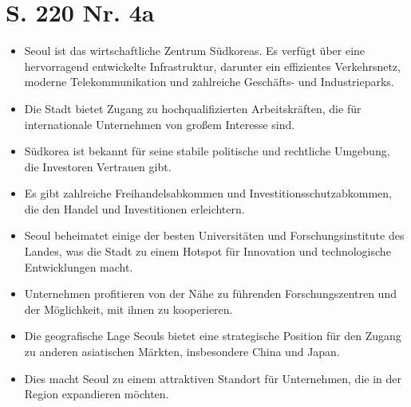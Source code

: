 \documentclass[12pt,a4paper]{report}
\begin{document}
	\section{S. 220 Nr. 4a}
	\begin{itemize}
		\item Seoul ist das wirtschaftliche Zentrum Südkoreas. Es verfügt über eine hervorragend entwickelte Infrastruktur, darunter ein effizientes Verkehrsnetz, moderne Telekommunikation und zahlreiche Geschäfts- und Industrieparks.
		\item Die Stadt bietet Zugang zu hochqualifizierten Arbeitskräften, die für internationale Unternehmen von großem Interesse sind.
		\item Südkorea ist bekannt für seine stabile politische und rechtliche Umgebung, die Investoren Vertrauen gibt.
		\item Es gibt zahlreiche Freihandelsabkommen und Investitionsschutzabkommen, die den Handel und Investitionen erleichtern.
		\item Seoul beheimatet einige der besten Universitäten und Forschungsinstitute des Landes, was die Stadt zu einem Hotspot für Innovation und technologische Entwicklungen macht.
		\item Unternehmen profitieren von der Nähe zu führenden Forschungszentren und der Möglichkeit, mit ihnen zu kooperieren.
		\item Die geografische Lage Seouls bietet eine strategische Position für den Zugang zu anderen asiatischen Märkten, insbesondere China und Japan.
		\item  Dies macht Seoul zu einem attraktiven Standort für Unternehmen, die in der Region expandieren möchten.
	\end{itemize}
	
\end{document}
